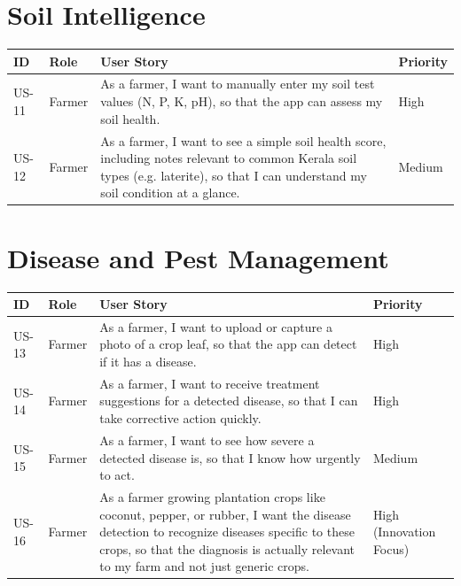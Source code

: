 \documentclass[12pt,a4paper]{article}
\begin{document}
\section{Soil Intelligence}
\begin{longtable}{p{1.3cm} p{1.6cm} p{9.3cm} p{1.5cm}}
\toprule
\textbf{ID} & \textbf{Role} & \textbf{User Story} & \textbf{Priority} \\
\midrule
\endhead
US-11 & Farmer & As a farmer, I want to manually enter my soil test values (N, P, K, pH), so that the app can assess my soil health. & High \\
US-12 & Farmer & As a farmer, I want to see a simple soil health score, including notes relevant to common Kerala soil types (e.g. laterite), so that I can understand my soil condition at a glance. & Medium \\
\bottomrule
\end{longtable}

\section{Disease and Pest Management}
\begin{longtable}{p{1.3cm} p{1.6cm} p{9.3cm} p{1.5cm}}
\toprule
\textbf{ID} & \textbf{Role} & \textbf{User Story} & \textbf{Priority} \\
\midrule
\endhead
US-13 & Farmer & As a farmer, I want to upload or capture a photo of a crop leaf, so that the app can detect if it has a disease. & High \\
US-14 & Farmer & As a farmer, I want to receive treatment suggestions for a detected disease, so that I can take corrective action quickly. & High \\
US-15 & Farmer & As a farmer, I want to see how severe a detected disease is, so that I know how urgently to act. & Medium \\
US-16 & Farmer & As a farmer growing plantation crops like coconut, pepper, or rubber, I want the disease detection to recognize diseases specific to these crops, so that the diagnosis is actually relevant to my farm and not just generic crops. & High (Innovation Focus) \\
\bottomrule
\end{longtable}

\end{document}
